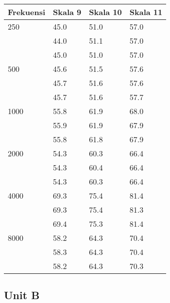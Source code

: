 \documentclass{article} %
\begin{document}
	\begin{table}[!ht]
		\begin{tabular}{|l|l|l|l|}
			\hline
			\textbf{Frekuensi}	& \textbf{Skala 9} & \textbf{Skala 10} & \textbf{Skala 11} \\ \hline
			250	& 45.0 & 51.0 & 57.0 \\ \hline
				& 44.0 & 51.1 & 57.0 \\ \hline
				& 45.0 & 51.0 & 57.0 \\ \hline \hline
			500	& 45.6 & 51.5 & 57.6 \\ \hline
				& 45.7 & 51.6 & 57.6 \\ \hline
				& 45.7 & 51.6 & 57.7 \\ \hline \hline
			1000& 55.8 & 61.9 & 68.0 \\ \hline
				& 55.9 & 61.9 & 67.9 \\ \hline
				& 55.8 & 61.8 & 67.9 \\ \hline \hline
			2000& 54.3 & 60.3 & 66.4 \\ \hline
				& 54.3 & 60.4 & 66.4 \\ \hline
				& 54.3 & 60.3 & 66.4 \\ \hline \hline
			4000& 69.3 & 75.4 & 81.4 \\ \hline
				& 69.3 & 75.4 & 81.3 \\ \hline
				& 69.4 & 75.3 & 81.4 \\ \hline \hline
			8000& 58.2 & 64.3 & 70.4 \\ \hline
				& 58.3 & 64.3 & 70.4 \\ \hline
				& 58.2 & 64.3 & 70.3 \\ \hline \hline
		\end{tabular}
	\end{table}

	\subsection{Unit B}
\end{document}
